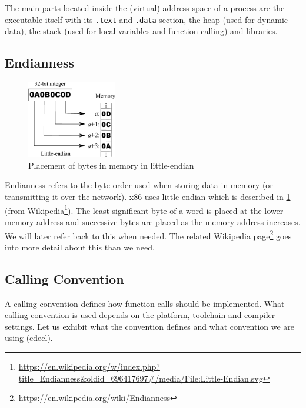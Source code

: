 \documentclass[article]{uibk}
\begin{document}
The main parts located inside the (virtual) address space of a process are the
executable itself with its \texttt{.text} and \texttt{.data} section, the heap
(used for dynamic data), the stack (used for local variables and function
calling) and libraries.

\subsection{Endianness}
\label{sub:endianness}

\begin{figure}[H]
    \centering
    \includegraphics[width=0.35\textwidth]{gfx/little_endian.pdf}
    \caption{Placement of bytes in memory in little-endian}
    \label{fig:little_endian}
\end{figure}

Endianness refers to the byte order used when storing data in memory (or
transmitting it over the network). x86 uses little-endian which is described in
\cref{fig:little_endian} (from
Wikipedia\footnote{\url{https://en.wikipedia.org/w/index.php?title=Endianness&oldid=696417697\#/media/File:Little-Endian.svg}}).
The least significant byte of a word is placed at the lower memory address and
successive bytes are placed as the memory address increases. We will later
refer back to this when needed. The related Wikipedia
page\footnote{\url{https://en.wikipedia.org/wiki/Endianness}} goes into more
detail about this than we need.

\subsection{Calling Convention}
\label{sub:calling_convention}

A calling convention defines how function calls should be implemented. What
calling convention is used depends on the platform, toolchain and compiler
settings. Let us exhibit what the convention defines and what convention we are
using (cdecl).
\end{document}
